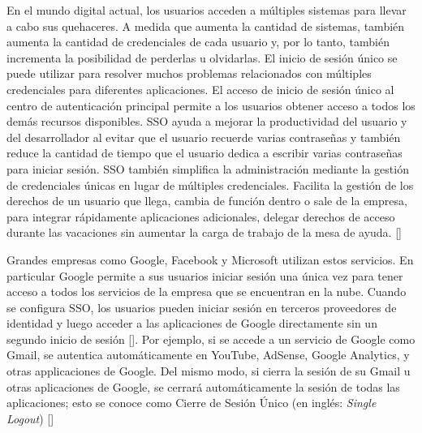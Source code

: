En el mundo digital actual, los usuarios acceden a múltiples sistemas para llevar a cabo sus quehaceres. A medida que aumenta la cantidad de sistemas, también aumenta la cantidad de credenciales de cada usuario y, por lo tanto, también incrementa la posibilidad de perderlas u olvidarlas. El inicio de sesión único se puede utilizar para resolver muchos problemas relacionados con múltiples credenciales para diferentes aplicaciones. El acceso de inicio de sesión único al centro de autenticación principal permite a los usuarios obtener acceso a todos los demás recursos disponibles. SSO ayuda a mejorar la productividad del usuario y del desarrollador al evitar que el usuario recuerde varias contraseñas y también reduce la cantidad de tiempo que el usuario dedica a escribir varias contraseñas para iniciar sesión. SSO también simplifica la administración mediante la gestión de credenciales únicas en lugar de múltiples credenciales. Facilita la gestión de los derechos de un usuario que llega, cambia de función dentro o sale de la empresa, para integrar rápidamente aplicaciones adicionales, delegar derechos de acceso durante las vacaciones sin aumentar la carga de trabajo de la mesa de ayuda. [\cite{radha2012survey}]

Grandes empresas como Google, Facebook y Microsoft utilizan estos servicios. En particular Google permite a sus usuarios iniciar sesión una única vez para tener acceso a todos los servicios de la empresa que se encuentran en la nube. Cuando se configura SSO, los usuarios pueden iniciar sesión en terceros proveedores de identidad y luego acceder a las aplicaciones de Google directamente sin un segundo inicio de sesión [\cite{google-support}]. Por ejemplo, si se accede a un servicio de Google como Gmail, se autentica automáticamente en YouTube, AdSense, Google Analytics, y otras applicaciones de Google. Del mismo modo, si cierra la sesión de su Gmail u otras aplicaciones de Google, se cerrará automáticamente la sesión de todas las aplicaciones; esto se conoce como Cierre de Sesión Único (en inglés: \textit{Single Logout}) [\cite{sso-doc}]

